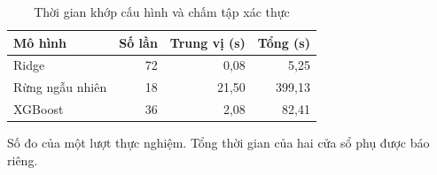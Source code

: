\documentclass[conference,a4paper]{IEEEtran}
\begin{document}
\begin{table}[!t]
\caption{Thời gian khớp cấu hình và chấm tập xác thực}
\label{tab:run_timings}
\centering\footnotesize
\setlength{\tabcolsep}{3pt}
\begin{tabularx}{\columnwidth}{@{}Xrrr@{}}
\toprule
\textbf{Mô hình} & \textbf{Số lần} & \textbf{Trung vị (s)} & \textbf{Tổng (s)} \\
\midrule
Ridge & 72 & 0,08 & 5,25 \\
Rừng ngẫu nhiên & 18 & 21,50 & 399,13 \\
XGBoost & 36 & 2,08 & 82,41 \\
\bottomrule
\end{tabularx}
\par\smallskip\raggedright\scriptsize Số đo của một lượt thực nghiệm. Tổng thời gian của hai cửa sổ phụ được báo riêng.
\end{table}
\end{document}

